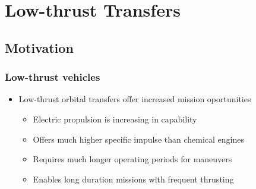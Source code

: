 

\section{Low-thrust Transfers}
\subsection{Motivation}

\begin{frame} %
\frametitle{Low-thrust vehicles} %
\begin{itemize}
    \item Low-thrust orbital transfers offer increased mission oportunities
    \begin{itemize}
        \item Electric propulsion is increasing in capability
        \item Offers much higher specific impulse than chemical engines 
        \item Requires much longer operating periods for maneuvers 
        \item Enables long duration missions with frequent thrusting
    \end{itemize}
\end{itemize}


\end{frame}
